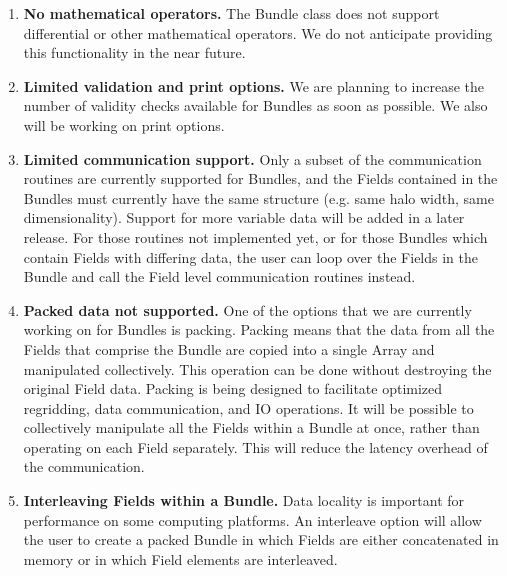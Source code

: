 
\label{sec:bundlerest}

\begin{enumerate}
\item{\bf No mathematical operators.}
The Bundle class does not support differential or other
mathematical operators.  We do not anticipate providing this 
functionality in the near future.

\item{\bf Limited validation and print options.}
We are planning to increase the number of validity checks available
for Bundles as soon as possible.  We also will
be working on print options.

\item{\bf Limited communication support.}
Only a subset of the communication routines are currently supported
for Bundles, and the Fields contained in the Bundles must currently
have the same structure (e.g. same halo width, same dimensionality). 
Support for more variable data will be added in a later release.
For those routines not implemented yet, or for those Bundles which
contain Fields with differing data, the user can loop over the Fields 
in the Bundle and call the Field level communication routines instead.

\item{\bf Packed data not supported.}
One of the options that we are currently working on for Bundles is
packing.  Packing means that the data from all the
Fields that comprise the Bundle are copied into a single Array and
manipulated collectively.  This operation can be done without 
destroying the original Field data.  Packing is being designed to 
facilitate optimized regridding, data communication, and IO operations.  
It will be possible to collectively manipulate all the Fields within 
a Bundle at once, rather than operating on each Field separately.  
This will reduce the latency overhead of the communication.  

\item{\bf Interleaving Fields within a Bundle.}
Data locality is important for performance on some computing
platforms.  An interleave option will allow the user to create
a packed Bundle in which Fields are either concatenated in memory
or in which Field elements are interleaved.

\end{enumerate}




